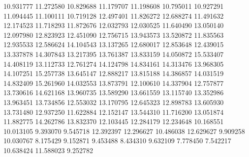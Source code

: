 10.931777
11.272580
10.829688
11.179707
11.198608
10.795011
10.927291
11.094445
11.100111
10.719128
12.497401
11.826272
12.688274
11.491632
12.174523
11.718293
11.872676
12.032793
12.030525
11.640490
13.050140
12.097980
12.823923
12.451090
12.756715
13.943573
13.520872
11.835563
12.935533
12.586624
14.104543
13.137265
12.680017
12.853648
12.439015
13.337878
14.307843
13.217395
13.761387
13.833159
14.050872
15.533407
14.408119
13.112733
12.761274
14.124798
14.834161
14.313476
13.968305
14.107251
15.257738
13.645147
12.888217
13.815188
14.386857
14.031519
14.832409
15.261960
14.032553
13.873791
12.100610
14.337904
12.757877
13.730616
14.621168
13.960735
13.589290
13.661559
13.115740
13.352986
13.963451
13.734856
12.553032
13.170795
12.645323
12.898783
13.605930
13.731480
12.937250
11.622884
12.152147
13.544310
11.716200
13.051874
11.882775
14.262786
13.832370
12.103445
12.284179
12.234648
10.168551
10.013105
9.393070
9.545718
12.392397
12.296627
10.486038
12.629627
9.909258
10.030767
8.175429
9.152871
9.453488
8.434310
9.632109
7.778450
7.542217
10.638424
11.588023
9.252782
